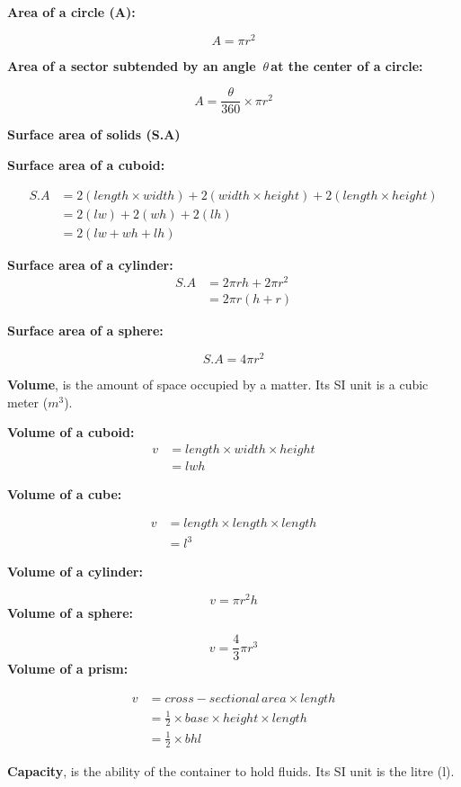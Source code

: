 \documentclass[
  letterpaper,
  DIV=11,
  numbers=noendperiod]{scrreprt}
\begin{document}
\textbf{Area of a circle (A):}

\[A=\pi r^2\]

\textbf{Area of a sector subtended by an angle \,$\theta $\,at the center of a circle:}

\[A=\frac{\theta}{360} \times\pi r^2\]

\centerline{\textbf{Surface area of solids (S.A)}}

\textbf{Surface area of a cuboid:}

\[
\begin{align*}
S.A&=2(length \times width)+2(width \times height)+2(length\times height)\\
&=2(lw)+2(wh)+2(lh)\\
&=2(lw+wh+lh)
\end{align*}
\]

\textbf{Surface area of a cylinder:} \[
\begin{align*}
S.A&=2\pi rh+2\pi r^2\\&=2\pi r(h+r)
\end{align*}
\]

\textbf{Surface area of a sphere:}

\[S.A=4\pi r^2\]

\textbf{Volume}, is the amount of space occupied by a matter. Its SI
unit is a cubic meter (\(m^3\)).

\textbf{Volume of a cuboid:} \[
\begin{align*}
v&=length \times width \times height\\&=lwh
\end{align*}
\]

\textbf{Volume of a cube:}

\[
\begin{align*}
v&=length \times length \times length \\
&=l^3 
\end{align*}
\]

\textbf{Volume of a cylinder:}

\[ v=\pi r^2 h\] \textbf{Volume of a sphere:}

\[ v=\frac{4}{3} \pi r^3\] \textbf{Volume of a prism:}

\[ 
\begin{align*}
v&=cross-sectional \,area \times length \\
&=\frac{1}{2}\times base\times height\times length\\
&=\frac{1}{2}\times bhl
\end{align*}
\]

\textbf{Capacity}, is the ability of the container to hold fluids. Its
SI unit is the litre (l).
\end{document}
